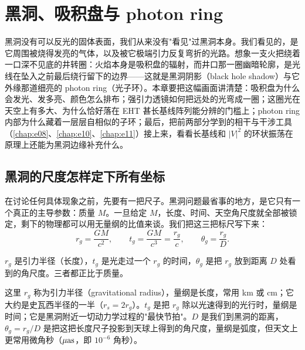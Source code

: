 \chapter{黑洞、吸积盘与 photon ring}
\label{chap:e19}

\begin{chapteropening}
黑洞没有可以反光的固体表面，我们从来没有"看见"过黑洞本身。我们看见的，是它周围被烧得发亮的气体，以及被它极端引力反复弯折的光路。想象一支火把绕着一口深不见底的井转圈：火焰本身是吸积盘的辐射，而井口那一圈幽暗轮廓，是光线在坠入之前最后绕行留下的边界——这就是黑洞阴影（black hole shadow）与它外缘那道细亮的 photon ring（光子环）。本章要把这幅画面讲清楚：吸积盘为什么会发光、发多亮、颜色怎么排布；强引力透镜如何把远处的光弯成一圈；这圈光在天空上有多大、为什么恰好落在 EHT 甚长基线阵列能分辨的门槛上；photon ring 内部为什么藏着一层层自相似的子环；最后，把前两部分学到的相干与干涉工具（\ref{chap:e08}、\ref{chap:e10}、\ref{chap:e11}）接上来，看看长基线和 \(|V|^2\) 的环状振荡在原理上还能为黑洞边缘补充什么。
\end{chapteropening}

\section{黑洞的尺度怎样定下所有坐标}
\label{sec:e19-scales}

在讨论任何具体现象之前，先要有一把尺子。黑洞问题最省事的地方，是它只有一个真正的主导参数：质量 \(M\)。一旦给定 \(M\)，长度、时间、天空角尺度就全部被锁定，剩下的物理都可以用无量纲的比值来谈。我们把这三把标尺写下来：
\begin{equation}
  r_g=\frac{GM}{c^2},\qquad
  t_g=\frac{GM}{c^3}=\frac{r_g}{c},\qquad
  \theta_g=\frac{r_g}{D}.
  \label{eq:e19-scales}
\end{equation}
\begin{formulaexplain}
\(r_g\) 是引力半径（长度），\(t_g\) 是光走过一个 \(r_g\) 的时间，\(\theta_g\) 是把 \(r_g\) 放到距离 \(D\) 处看到的角尺度。三者都正比于质量。
\end{formulaexplain}
这里 \(r_g\) 称为引力半径（gravitational radius），量纲是长度，常用 km 或 cm；它大约是史瓦西半径的一半（\(r_s=2r_g\)）。\(t_g\) 是把 \(r_g\) 除以光速得到的光行时，量纲是时间；它是黑洞附近一切动力学过程的"最快节拍"。\(D\) 是我们到黑洞的距离，\(\theta_g=r_g/D\) 是把这把长度尺子投影到天球上得到的角尺度，量纲是弧度，但天文上更常用微角秒（\(\mu{\rm as}\)，即 \(10^{-6}\) 角秒）。

